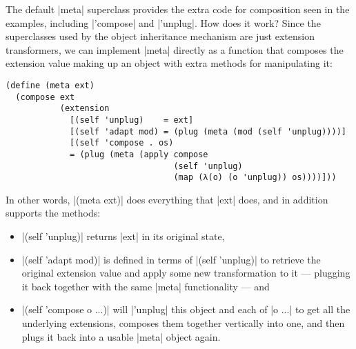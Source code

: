 The default \scm|meta| superclass provides the extra code for composition seen in the examples, including \scm|'compose| and \scm|'unplug|.
How does it work?
Since the superclasses used by the object inheritance mechanism are just extension transformers, we can implement \scm|meta| directly as a function that composes the extension value making up an object with extra methods for manipulating it:
\begin{verbatim}
(define (meta ext)
  (compose ext
           (extension
             [(self 'unplug)    = ext]
             [(self 'adapt mod) = (plug (meta (mod (self 'unplug))))]
             [(self 'compose . os)
             = (plug (meta (apply compose
                                  (self 'unplug)
                                  (map (λ(o) (o 'unplug)) os))))]))
\end{verbatim}
In other words, \scm|(meta ext)| does everything that \scm|ext| does, and in addition supports the methods:
\begin{itemize}
\item \scm|(self 'unplug)| returns \scm|ext| in its original state,
\item \scm|(self 'adapt mod)| is defined in terms of \scm|(self 'unplug)| to retrieve the original extension value and apply some new transformation to it --- plugging it back together with the same \scm|meta| functionality --- and
\item \scm|(self 'compose o ...)| will \scm|'unplug| this object and each of \scm|o ...| to get all the underlying extensions, composes them together vertically into one, and then plugs it back into a usable \scm|meta| object again.
\end{itemize}

